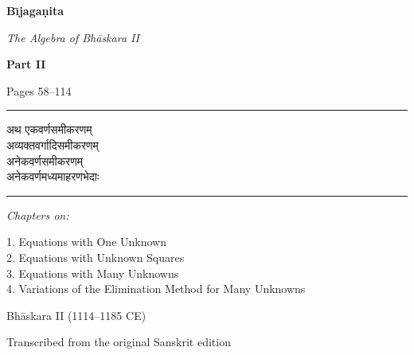 \documentclass[11pt,a4paper]{article}
\begin{document}
\begin{titlepage}
\centering
\vspace*{2cm}

{\Huge\bfseries\color{titlecolor} B\={\i}jaga\d{n}ita\par}
\vspace{0.5cm}
{\Large\itshape The Algebra of Bh\={a}skara II\par}

\vspace{1.5cm}

{\LARGE\bfseries\color{sectioncolor} Part II\par}
\vspace{0.3cm}
{\large Pages 58--114\par}

\vspace{2cm}

\begin{center}
\rule{0.6\textwidth}{1pt}
\end{center}

\vspace{0.5cm}

{\large\devanagarifont
अथ एकवर्णसमीकरणम्\\
अव्यक्तवर्गादिसमीकरणम्\\
अनेकवर्णसमीकरणम्\\[0.5em]
अनेकवर्णमध्यमाहरणभेदाः
}

\vspace{0.5cm}

\begin{center}
\rule{0.6\textwidth}{1pt}
\end{center}

\vspace{1cm}

{\large\itshape Chapters on:\par}
\vspace{0.3cm}
{\normalsize
1. Equations with One Unknown\\
2. Equations with Unknown Squares\\
3. Equations with Many Unknowns\\
4. Variations of the Elimination Method for Many Unknowns\par}

\vfill

{\large Bh\={a}skara II (1114--1185 CE)\par}
\vspace{0.5cm}
{\small Transcribed from the original Sanskrit edition\par}

\end{titlepage}
\end{document}
